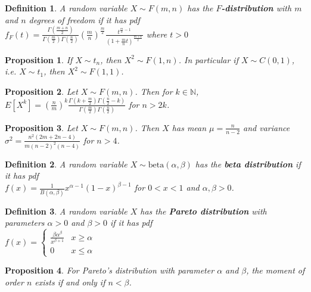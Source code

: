 \documentclass[14pt,twoside]{extreport}
\theoremstyle{dotless}
\newtheorem*{defn}{Definition}
\newtheorem*{prop}{Proposition} %
\begin{document}
\begin{defn}
    A random variable $X \sim F(m,n)$ has the \textbf{$F$-distribution} with $m$ and $n$ degrees of freedom if it has pdf \\ 
    $ f_F(t) = \displaystyle \frac{\Gamma\left(\frac{m + n}{2} \right)}{\Gamma\left(\frac{m}{2} \right) \Gamma\left(\frac{n}{2} \right)} \displaystyle \left(\frac{m}{n}\right)^{\frac{m}{2}} \frac{t^{\frac{m}{2} - 1}}{(1 + \frac{m}{n}t)^{\frac{m + n}{2}}} $ where $t > 0$
\end{defn}

\begin{prop}
    If $X \sim t_n$, then $X^2 \sim F(1,n)$. In particular if $X \sim C(0,1)$, i.e. $X \sim t_1$, then $X^2 \sim F(1,1)$.
\end{prop}

\begin{prop}
    Let $X \sim F(m,n)$. Then for $k \in \mathbb{N}$, $E[X^k] =\displaystyle \left(\frac{n}{m}\right)^k \frac{\Gamma(k + \frac{m}{2}) \Gamma(\frac{n}{2} - k)}{\Gamma(\frac{m}{2}) \Gamma(\frac{n}{2})}$ for $n > 2k$.
\end{prop}

\begin{prop}
    Let $X \sim F(m,n)$. Then $X$ has mean $\mu = \displaystyle \frac{n}{n-2}$ and variance $\sigma^2 = \displaystyle \frac{n^2 (2m + 2n - 4)}{m (n-2)^2 (n-4)}$ for $n > 4$.
\end{prop}

\begin{defn}
    A random variable $X \sim \text{beta}(\alpha, \beta)$ has the \textbf{beta distribution} if it has pdf \\
    $ f(x) = \displaystyle \frac{1}{B(\alpha, \beta)} x^{\alpha-1} (1-x)^{\beta - 1}$ for $0 < x < 1$ and $\alpha, \beta > 0$.
\end{defn}

\begin{defn}
    A random variable $X$ has the \textbf{Pareto distribution} with parameters $\alpha > 0$ and $\beta > 0$ if it has pdf \\
    $f(x) = \begin{cases} \displaystyle \frac{\beta \alpha^\beta}{x^{\beta + 1}} & x \geq \alpha \\ 0 & x \leq \alpha \end{cases}$
\end{defn}

\begin{prop}
    For Pareto's distribution with parameter $\alpha$ and $\beta$, the moment of order $n$ exists if and only if $n < \beta$. 
\end{prop}
\end{document}
